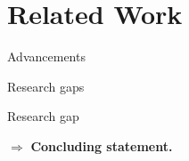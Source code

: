 \section{Related Work}

\begin{frame}{Advancements}
	\note{}
\end{frame}

\begin{frame}{Research gaps}
	\begin{alertblock}{Research gap}
	\end{alertblock}
																
	$\Rightarrow$ \textbf{Concluding statement.}
																
	\note{}
\end{frame}

